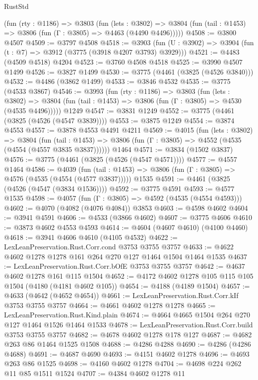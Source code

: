 \begin{lexlean}{RustStd}
\begin{coremodule}
    (fun (rty : @1186) =>
    @3803
      (fun (lets : @3802) =>
      @3804 (fun (tail : @1453) => @3806 (fun (Γ : @3805) => @4463 (@4490 @4496)))))
@4508 := @3800 @4507
@4509 := @3797 @4508
@4518 := @3903 (fun (U : @3902) => @3904 (fun (t : @7) => @3912 (@3775 (@3918 @4207 @3793) @3929)))
@4521 := @4483 (@4509 @4518) @4204
@4523 := @3760 @4508 @4518
@4525 := @3990 @4507 @1499
@4526 := @3827 @1499
@4530 := @3775 (@4461 (@3825 (@4526 @3840)))
@4532 := @4486 (@3862 @1499)
@4533 := @3846 @4532
@4535 := @3775 (@4533 @3867)
@4546 := @3993
    (fun (rty : @1186) =>
    @3803
      (fun (lets : @3802) =>
      @3804 (fun (tail : @1453) => @3806 (fun (Γ : @3805) => @4530 (@4535 @4496)))))
    @1249
@4547 := @3831 @1249
@4552 := @3775 (@4461 (@3825 (@4526 (@4547 @3839))))
@4553 := @3875 @1249
@4554 := @3874 @4553
@4557 := @3878 @4553 @4491 @4211
@4569 := @4015
    (fun (lets : @3802) =>
    @3804
      (fun (tail : @1453) => @3806 (fun (Γ : @3805) => @4552 (@4535 (@4554 (@4557 @3835 @3837))))))
    @1464
@4571 := @3834 (@1502 @3837)
@4576 := @3775 (@4461 (@3825 (@4526 (@4547 @4571))))
@4577 := @4557 @1464
@4586 := @4039
    (fun (tail : @1453) => @3806 (fun (Γ : @3805) => @4576 (@4535 (@4554 (@4577 @3837)))))
    @1535
@4591 := @4461 (@3825 (@4526 (@4547 (@3834 @1536))))
@4592 := @3775 @4591
@4593 := @4577 @1535
@4598 := @4057 (fun (Γ : @3805) => @4592 (@4535 (@4554 @4593)))
@4602 := @4070 (@4082 (@4076 @4084)) @3853
@4603 := @4598 @4602
@4604 := @3941 @4591
@4606 := @4533 (@3866 @4602)
@4607 := @3775 @4606
@4610 := @3873 @4602 @4553 @4593
@4614 := @4604 (@4607 @4610) (@4100 @4460)
@4618 := @3941 @4606 @4610 (@4105 @4532)
@4622 := LexLeanPreservation.Rust.Corr.cond @3753 @3755 @3757
@4633 := @4622 @4602 @1278 @1278 @161 @264 @270 @127 @1464 @1504 @1464 @1535
@4637 := LexLeanPreservation.Rust.Corr.bOfE @3753 @3755 @3757
@4642 := @4637 @4602 @1278 @161 @115 @1504
@4652 := @4172 @4602 @1278 @105 @115 @105 @1504 (@4180 (@4181 @4602 @105))
@4654 := @4188 (@4189 @1504)
@4657 := @4633 (@4642 (@4652 @4654))
@4661 := LexLeanPreservation.Rust.Corr.kIf @3753 @3755 @3757
@4664 := @4661 @4602 @1278 @1278
@4665 := LexLeanPreservation.Rust.Kind.plain
@4674 := @4664 @4665 @1504 @264 @270 @127 @1464 @1526 @1464 @1533
@4678 := LexLeanPreservation.Rust.Corr.build @3753 @3755 @3757
@4682 := @4678 @4602 @1278 @178 @127
@4687 := @4682 @263 @86 @1464 @1525 @1508
@4688 := @4286 @4288
@4690 := @4286 (@4286 @4688)
@4691 := @4687 @4690
@4693 := @4151 @4602 @1278
@4696 := @4693 @263 @86 @1525
@4698 := @4160 @4602 @1278
@4704 := @4698 @224 @262 @11 @85 @1511 @1524
@4707 := @4384 @4602 @1278 @11

\end{coremodule}
\end{lexlean}
